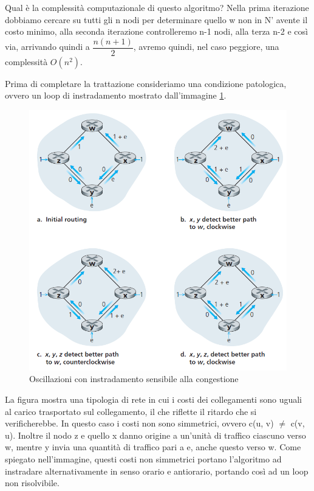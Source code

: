 \documentclass[11pt,a4paper]{book}
\begin{document}
Qual è la complessità computazionale di questo algoritmo? Nella prima iterazione dobbiamo cercare su tutti gli n nodi per determinare quello w non in N' avente il costo minimo, alla seconda iterazione controlleremo n-1 nodi, alla terza n-2 e così via, arrivando quindi a $\dfrac{n(n+1)}{2}$, avremo quindi, nel caso peggiore, una complessità $O(n^{2})$.

Prima di completare la trattazione consideriamo una condizione patologica, ovvero un loop di instradamento mostrato dall'immagine \ref{fig: 063}.
\begin{figure}
	\includegraphics[scale=0.7]{img/063.png}
	\caption{Oscillazioni con instradamento sensibile alla congestione}
	\label{fig: 063}
\end{figure}
La figura mostra una tipologia di rete in cui i costi dei collegamenti sono uguali al carico trasportato sul collegamento, il che riflette il ritardo che si verificherebbe. In questo caso i costi non sono simmetrici, ovvero c(u, v) $\neq$ c(v, u). Inoltre il nodo z e quello x danno origine a un'unità di traffico ciascuno verso w, mentre y invia una quantità di traffico pari a e, anche questo verso w. Come spiegato nell'immagine, questi costi non simmetrici portano l'algoritmo ad instradare alternativamente in senso orario e antiorario, portando così ad un loop non risolvibile.
\end{document}
